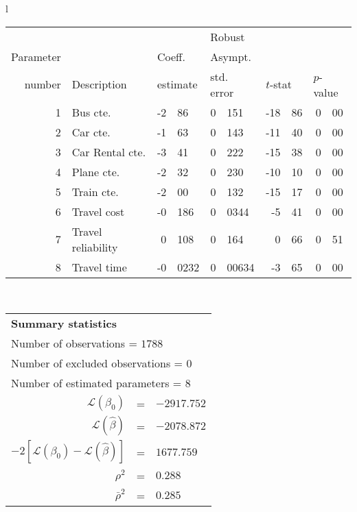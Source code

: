   \begin{tabular}{l}
\begin{tabular}{rlr@{.}lr@{.}lr@{.}lr@{.}l}
         &                       &   \multicolumn{2}{l}{}    & \multicolumn{2}{l}{Robust}  &     \multicolumn{4}{l}{}   \\
Parameter &                       &   \multicolumn{2}{l}{Coeff.}      & \multicolumn{2}{l}{Asympt.}  &     \multicolumn{4}{l}{}   \\
number &  Description                     &   \multicolumn{2}{l}{estimate}      & \multicolumn{2}{l}{std. error}  &   \multicolumn{2}{l}{$t$-stat}  &   \multicolumn{2}{l}{$p$-value}   \\

\hline

1 & Bus cte. & -2&86 & 0&151 & -18&86 & 0&00\\
2 & Car cte. & -1&63 & 0&143 & -11&40 & 0&00\\
3 & Car Rental cte. & -3&41 & 0&222 & -15&38 & 0&00\\
4 & Plane cte. & -2&32 & 0&230 & -10&10 & 0&00\\
5 & Train cte. & -2&00 & 0&132 & -15&17 & 0&00\\
6 & Travel cost & -0&186 & 0&0344 & -5&41 & 0&00\\
7 & Travel reliability & 0&108 & 0&164 & 0&66 & 0&51\\
8 & Travel time & -0&0232 & 0&00634 & -3&65 & 0&00\\
\hline
\end{tabular}
\\
\begin{tabular}{rcl}
\multicolumn{3}{l}{\bf Summary statistics}\\
\multicolumn{3}{l}{ Number of observations = $1788$} \\
\multicolumn{3}{l}{ Number of excluded observations = $0$} \\
\multicolumn{3}{l}{ Number of estimated  parameters = $8$} \\
 $\mathcal{L}(\beta_0)$ &=&  $-2917.752$ \\
 $\mathcal{L}(\hat{\beta})$ &=& $-2078.872 $  \\
 $-2[\mathcal{L}(\beta_0) -\mathcal{L}(\hat{\beta})]$ &=& $1677.759$ \\
    $\rho^2$ &=&   $0.288$ \\
    $\bar{\rho}^2$ &=&    $0.285$ \\
\end{tabular}
  \end{tabular}
